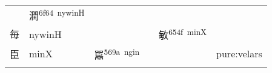\documentclass[14pt,a4paper]{scrartcl}
\begin{document}
\begin{longtable}[c]{@{}llllll@{}}
\begin{minipage}[t]{0.14\columnwidth}\raggedright\strut
\strut\end{minipage} &
\begin{minipage}[t]{0.14\columnwidth}\raggedright\strut
潤\textsuperscript{6f64~nywinH}
\strut\end{minipage} &
\begin{minipage}[t]{0.14\columnwidth}\raggedright\strut
\strut\end{minipage}\tabularnewline
\begin{minipage}[t]{0.14\columnwidth}\raggedright\strut
毎
\strut\end{minipage} &
\begin{minipage}[t]{0.14\columnwidth}\raggedright\strut
nywinH
\strut\end{minipage} &
\begin{minipage}[t]{0.14\columnwidth}\raggedright\strut
\strut\end{minipage} &
\begin{minipage}[t]{0.14\columnwidth}\raggedright\strut
\strut\end{minipage} &
\begin{minipage}[t]{0.14\columnwidth}\raggedright\strut
敏\textsuperscript{654f~minX}
\strut\end{minipage} &
\begin{minipage}[t]{0.14\columnwidth}\raggedright\strut
\strut\end{minipage}\tabularnewline
\begin{minipage}[t]{0.14\columnwidth}\raggedright\strut
臣
\strut\end{minipage} &
\begin{minipage}[t]{0.14\columnwidth}\raggedright\strut
minX
\strut\end{minipage} &
\begin{minipage}[t]{0.14\columnwidth}\raggedright\strut
嚚\textsuperscript{569a~ngin}
\strut\end{minipage} &
\begin{minipage}[t]{0.14\columnwidth}\raggedright\strut
\strut\end{minipage} &
\begin{minipage}[t]{0.14\columnwidth}\raggedright\strut
\strut\end{minipage} &
\begin{minipage}[t]{0.14\columnwidth}\raggedright\strut
pure:velars
\strut\end{minipage}\tabularnewline
\begin{minipage}[t]{0.14\columnwidth}\raggedright\strut

\end{minipage}
\end{longtable}
\end{document}
